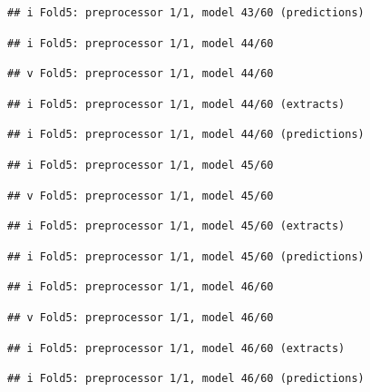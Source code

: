 \documentclass[
]{article}
\begin{document}
\begin{verbatim}
## i Fold5: preprocessor 1/1, model 43/60 (predictions)
\end{verbatim}

\begin{verbatim}
## i Fold5: preprocessor 1/1, model 44/60
\end{verbatim}

\begin{verbatim}
## v Fold5: preprocessor 1/1, model 44/60
\end{verbatim}

\begin{verbatim}
## i Fold5: preprocessor 1/1, model 44/60 (extracts)
\end{verbatim}

\begin{verbatim}
## i Fold5: preprocessor 1/1, model 44/60 (predictions)
\end{verbatim}

\begin{verbatim}
## i Fold5: preprocessor 1/1, model 45/60
\end{verbatim}

\begin{verbatim}
## v Fold5: preprocessor 1/1, model 45/60
\end{verbatim}

\begin{verbatim}
## i Fold5: preprocessor 1/1, model 45/60 (extracts)
\end{verbatim}

\begin{verbatim}
## i Fold5: preprocessor 1/1, model 45/60 (predictions)
\end{verbatim}

\begin{verbatim}
## i Fold5: preprocessor 1/1, model 46/60
\end{verbatim}

\begin{verbatim}
## v Fold5: preprocessor 1/1, model 46/60
\end{verbatim}

\begin{verbatim}
## i Fold5: preprocessor 1/1, model 46/60 (extracts)
\end{verbatim}

\begin{verbatim}
## i Fold5: preprocessor 1/1, model 46/60 (predictions)
\end{verbatim}
\end{document}
